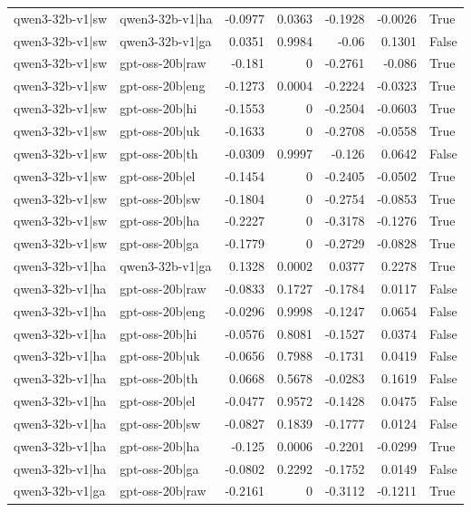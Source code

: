 \begin{table}
\begin{tabular}{l l r r r r l}
qwen3-32b-v1|sw & qwen3-32b-v1|ha & -0.0977 & 0.0363 & -0.1928 & -0.0026 & True \\
qwen3-32b-v1|sw & qwen3-32b-v1|ga & 0.0351 & 0.9984 & -0.06 & 0.1301 & False \\
qwen3-32b-v1|sw & gpt-oss-20b|raw & -0.181 & 0 & -0.2761 & -0.086 & True \\
qwen3-32b-v1|sw & gpt-oss-20b|eng & -0.1273 & 0.0004 & -0.2224 & -0.0323 & True \\
qwen3-32b-v1|sw & gpt-oss-20b|hi & -0.1553 & 0 & -0.2504 & -0.0603 & True \\
qwen3-32b-v1|sw & gpt-oss-20b|uk & -0.1633 & 0 & -0.2708 & -0.0558 & True \\
qwen3-32b-v1|sw & gpt-oss-20b|th & -0.0309 & 0.9997 & -0.126 & 0.0642 & False \\
qwen3-32b-v1|sw & gpt-oss-20b|el & -0.1454 & 0 & -0.2405 & -0.0502 & True \\
qwen3-32b-v1|sw & gpt-oss-20b|sw & -0.1804 & 0 & -0.2754 & -0.0853 & True \\
qwen3-32b-v1|sw & gpt-oss-20b|ha & -0.2227 & 0 & -0.3178 & -0.1276 & True \\
qwen3-32b-v1|sw & gpt-oss-20b|ga & -0.1779 & 0 & -0.2729 & -0.0828 & True \\
qwen3-32b-v1|ha & qwen3-32b-v1|ga & 0.1328 & 0.0002 & 0.0377 & 0.2278 & True \\
qwen3-32b-v1|ha & gpt-oss-20b|raw & -0.0833 & 0.1727 & -0.1784 & 0.0117 & False \\
qwen3-32b-v1|ha & gpt-oss-20b|eng & -0.0296 & 0.9998 & -0.1247 & 0.0654 & False \\
qwen3-32b-v1|ha & gpt-oss-20b|hi & -0.0576 & 0.8081 & -0.1527 & 0.0374 & False \\
qwen3-32b-v1|ha & gpt-oss-20b|uk & -0.0656 & 0.7988 & -0.1731 & 0.0419 & False \\
qwen3-32b-v1|ha & gpt-oss-20b|th & 0.0668 & 0.5678 & -0.0283 & 0.1619 & False \\
qwen3-32b-v1|ha & gpt-oss-20b|el & -0.0477 & 0.9572 & -0.1428 & 0.0475 & False \\
qwen3-32b-v1|ha & gpt-oss-20b|sw & -0.0827 & 0.1839 & -0.1777 & 0.0124 & False \\
qwen3-32b-v1|ha & gpt-oss-20b|ha & -0.125 & 0.0006 & -0.2201 & -0.0299 & True \\
qwen3-32b-v1|ha & gpt-oss-20b|ga & -0.0802 & 0.2292 & -0.1752 & 0.0149 & False \\
qwen3-32b-v1|ga & gpt-oss-20b|raw & -0.2161 & 0 & -0.3112 & -0.1211 & True \\

\end{tabular}
\end{table}

